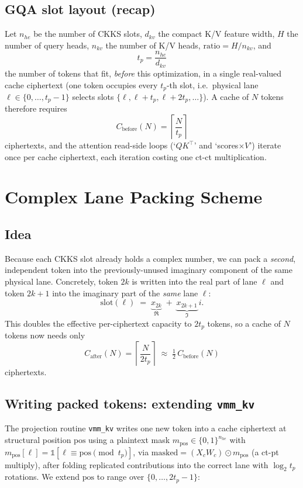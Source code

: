 \documentclass[11pt]{article}
\begin{document}
\subsection{GQA slot layout (recap)}
Let $n_{he}$ be the number of CKKS slots, $d_{kv}$ the compact K/V feature
width, $H$ the number of query heads, $n_{kv}$ the number of K/V heads,
$\mathrm{ratio} = H / n_{kv}$, and
\[
  t_p = \frac{n_{he}}{d_{kv}}
\]
the number of tokens that fit, \emph{before} this optimization, in a single
real-valued cache ciphertext (one token occupies every $t_p$-th slot,
i.e.\ physical lane $\ell \in \{0, \dots, t_p-1\}$ selects slots
$\{\ell, \ell+t_p, \ell+2t_p, \dots\}$). A cache of $N$ tokens therefore
requires
\[
  C_{\text{before}}(N) = \left\lceil \frac{N}{t_p} \right\rceil
\]
ciphertexts, and the attention read-side loops (`$QK^\top$' and
`scores$\times V$') iterate once per cache ciphertext, each iteration
costing one ct-ct multiplication.

\section{Complex Lane Packing Scheme}

\subsection{Idea}
Because each CKKS slot already holds a complex number, we can pack a
\emph{second}, independent token into the previously-unused imaginary
component of the same physical lane. Concretely, token $2k$ is written into
the real part of lane $\ell$ and token $2k+1$ into the imaginary part of the
\emph{same} lane $\ell$:
\[
  \text{slot}(\ell) \;=\; \underbrace{x_{2k}}_{\Re} \;+\; \underbrace{x_{2k+1}}_{\Im}\, i .
\]
This doubles the effective per-ciphertext capacity to $2 t_p$ tokens, so a
cache of $N$ tokens now needs only
\[
  C_{\text{after}}(N) = \left\lceil \frac{N}{2 t_p} \right\rceil
  \;\approx\; \tfrac{1}{2}\, C_{\text{before}}(N)
\]
ciphertexts.

\subsection{Writing packed tokens: extending \texttt{vmm\_kv}}
The projection routine \texttt{vmm\_kv} writes one new token into a cache
ciphertext at structural position $\mathrm{pos}$ using a plaintext mask
$m_{\mathrm{pos}} \in \{0,1\}^{n_{he}}$ with
$m_{\mathrm{pos}}[\ell] = \mathbb{1}[\ell \equiv \mathrm{pos} \!\!\pmod{t_p}]$,
via $\text{masked} = (X_c W_c) \odot m_{\mathrm{pos}}$ (a ct-pt multiply),
after folding replicated contributions into the correct lane with
$\log_2 t_p$ rotations. We extend $\mathrm{pos}$ to range over
$\{0, \dots, 2t_p - 1\}$:
\end{document}

